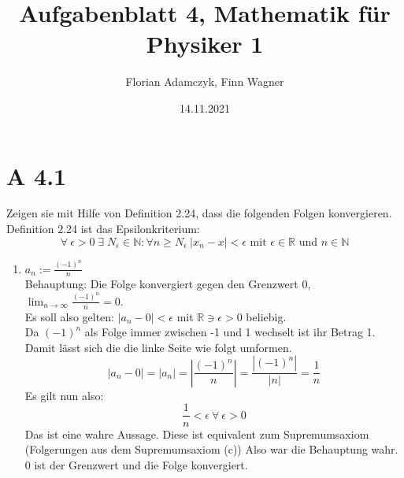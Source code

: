 \documentclass[11pt]{article}
\date{14.11.2021}
\title{Aufgabenblatt 4, Mathematik für Physiker 1}
\author{Florian Adamczyk, Finn Wagner}
\begin{document}
    \maketitle

    \section*{A 4.1}
    Zeigen sie mit Hilfe von Definition 2.24, dass die folgenden Folgen konvergieren.
    Definition 2.24 ist das Epsilonkriterium:
    \[\forall \: \epsilon > 0 \; \exists \; N_{\epsilon} \in \mathbb{N} : \forall n \geq N_{\epsilon} \: |x_n - x| < \epsilon
        \text{ mit } \epsilon \in \mathbb{R} \text{ und } n \in \mathbb{N}\]

    \begin{enumerate}[ label= (\roman*) ]
        \item \(a_n := \frac{ {(-1)}^n }{ n } \) \\
        Behauptung: Die Folge konvergiert gegen den Grenzwert 0, \(\lim_{n \to \infty } \frac{ {(-1)}^n }{ n } = 0 \). \\
        Es soll also gelten: \( |a_n - 0| < \epsilon \) mit \( \mathbb{R} \ni \epsilon > 0\) beliebig. \\
        Da \( { (-1) }^n \) als Folge immer zwischen -1 und 1 wechselt ist ihr Betrag 1. Damit lässt sich die die linke Seite wie folgt umformen.
        \[|a_n - 0| = |a_n| = | \frac{ {(-1)}^n }{ n } | = \frac{ |{(-1)}^n| }{ |n| } = \frac{ 1 }{ n } \]
        Es gilt nun also:
        \[ \frac{ 1 }{ n } < \epsilon \: \forall \: \epsilon > 0 \]
        Das ist eine wahre Aussage. Diese ist equivalent zum Supremumsaxiom (Folgerungen aus dem Supremumsaxiom (c))
        Also war die Behauptung wahr. 0 ist der Grenzwert und die Folge konvergiert.


\end{enumerate}
\end{document}
